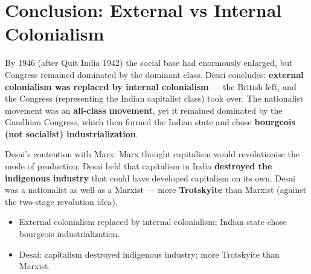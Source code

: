 \section{Conclusion: External vs Internal Colonialism}

By 1946 (after Quit India 1942) the social base had enormously enlarged, but Congress remained dominated by the dominant class. Desai concludes: \textbf{external colonialism was replaced by internal colonialism} --- the British left, and the Congress (representing the Indian capitalist class) took over. The nationalist movement was an \textbf{all-class movement}, yet it remained dominated by the Gandhian Congress, which then formed the Indian state and chose \textbf{bourgeois (not socialist) industrialization}.

\begin{CriticalPoint}
Desai's contention with Marx: Marx thought capitalism would revolutionise the mode of production; Desai held that capitalism in India \textbf{destroyed the indigenous industry} that could have developed capitalism on its own. Desai was a nationalist as well as a Marxist --- more \textbf{Trotskyite} than Marxist (against the two-stage revolution idea).
\end{CriticalPoint}

\begin{QuickRevision}
\begin{itemize}
\item External colonialism replaced by internal colonialism; Indian state chose bourgeois industrialization.
\item Desai: capitalism destroyed indigenous industry; more Trotskyite than Marxist.
\end{itemize}
\end{QuickRevision}
